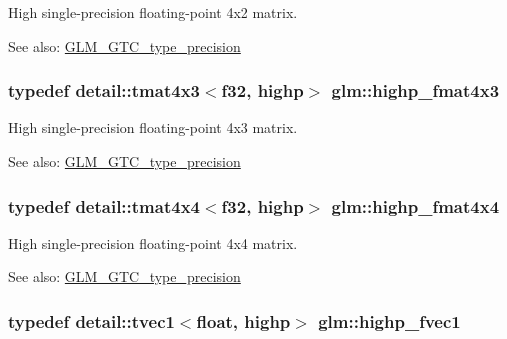 High single-precision floating-point 4x2 matrix. \begin{Desc}
\item[See also:]\hyperlink{group__gtc__type__precision}{GLM\_\-GTC\_\-type\_\-precision} \end{Desc}
\hypertarget{group__gtc__type__precision_g07f7578fc5a4dd8cdd8a532db25d535f}{
\subsubsection[highp\_\-fmat4x3]{\setlength{\rightskip}{0pt plus 5cm}typedef detail::tmat4x3$<$f32, highp$>$ {\bf glm::highp\_\-fmat4x3}}}
\label{group__gtc__type__precision_g07f7578fc5a4dd8cdd8a532db25d535f}


High single-precision floating-point 4x3 matrix. \begin{Desc}
\item[See also:]\hyperlink{group__gtc__type__precision}{GLM\_\-GTC\_\-type\_\-precision} \end{Desc}
\hypertarget{group__gtc__type__precision_gf0a98d6caffce89da963d3430e05ddb0}{
\subsubsection[highp\_\-fmat4x4]{\setlength{\rightskip}{0pt plus 5cm}typedef detail::tmat4x4$<$f32, highp$>$ {\bf glm::highp\_\-fmat4x4}}}
\label{group__gtc__type__precision_gf0a98d6caffce89da963d3430e05ddb0}


High single-precision floating-point 4x4 matrix. \begin{Desc}
\item[See also:]\hyperlink{group__gtc__type__precision}{GLM\_\-GTC\_\-type\_\-precision} \end{Desc}
\hypertarget{group__gtc__type__precision_g5d9f2208253856df60a57925f92ff0c8}{
\subsubsection[highp\_\-fvec1]{\setlength{\rightskip}{0pt plus 5cm}typedef detail::tvec1$<$float, highp$>$ {\bf glm::highp\_\-fvec1}}}
\label{group__gtc__type__precision_g5d9f2208253856df60a57925f92ff0c8}


